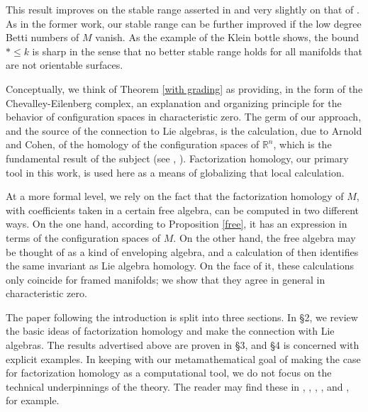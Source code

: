 \documentclass{compositio}
\theoremstyle{definition}\newtheorem{definition}{Definition}[section]
\theoremstyle{theorem}\newtheorem{lemma}[definition]{Lemma}
\theoremstyle{remark}\newtheorem*{conventions}{Conventions}
\theoremstyle{remark}\newtheorem*{acknowledgments}{Acknowledgments}
\theoremstyle{remark}\newtheorem*{outline}{Outline}
\theoremstyle{remark}\newtheorem*{questions}{Questions}
\theoremstyle{remark}\newtheorem{example}[definition]{Example}
\theoremstyle{definition}\newtheorem{construction}[definition]{Construction}
\theoremstyle{definition}\newtheorem*{convention}{Convention}
\theoremstyle{definition}\newtheorem*{conjecture}{Conjecture}
\theoremstyle{theorem}\newtheorem{theorem}[definition]{Theorem}
\theoremstyle{theorem}\newtheorem{paradigm}[definition]{Paradigm}
\theoremstyle{remark}\newtheorem{remark}[definition]{Remark}
\theoremstyle{corollary}\newtheorem{corollary}[definition]{Corollary}
\theoremstyle{theorem}\newtheorem{proposition}[definition]{Proposition}
\theoremstyle{definition}\newtheorem{question}[definition]{Question}
\begin{document}
This result improves on the stable range asserted in \cite{Church} and very slightly on that of \cite{ORWstab}. As in the former work, our stable range can be further improved if the low degree Betti numbers of $M$ vanish. As the example of the Klein bottle shows, the bound $*\leq k$ is sharp in the sense that no better stable range holds for all manifolds that are not orientable surfaces.

Conceptually, we think of Theorem \ref{with grading} as providing, in the form of the Chevalley-Eilenberg complex, an explanation and organizing principle for the behavior of configuration spaces in characteristic zero. The germ of our approach, and the source of the connection to Lie algebras, is the calculation, due to Arnold and Cohen, of the homology of the configuration spaces of $\mathbb{R}^n$, which is the fundamental result of the subject (see \cite{Arnold}, \cite{CLM}). Factorization homology, our primary tool in this work, is used here as a means of globalizing that local calculation. 

At a more formal level, we rely on the fact that the factorization homology of $M$, with coefficients taken in a certain free algebra, can be computed in two different ways. On the one hand, according to Proposition \ref{free}, it has an expression in terms of the configuration spaces of $M$. On the other hand, the free algebra may be thought of as a kind of enveloping algebra, and a calculation of \cite{Francis} then identifies the same invariant as Lie algebra homology. On the face of it, these calculations only coincide for framed manifolds; we show that they agree in general in characteristic zero.

The paper following the introduction is split into three sections. In \S2, we review the basic ideas of factorization homology and make the connection with Lie algebras. The results advertised above are proven in \S3, and \S4 is concerned with explicit examples. In keeping with our metamathematical goal of making the case for factorization homology as a computational tool, we do not focus on the technical underpinnings of the theory. The reader may find these in \cite{AF}, \cite{AFT}, \cite{FrancisTangent}, \cite{Francis}, and \cite{Lurie}, for example.
\end{document}

